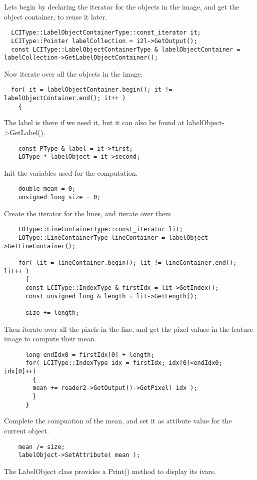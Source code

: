 \documentclass{InsightArticle}
\begin{document}
Lets begin by declaring the iterator for the objects in the image, and get the object container, to reuse it later.
\small \begin{verbatim}
  LCIType::LabelObjectContainerType::const_iterator it;
  LCIType::Pointer labelCollection = i2l->GetOutput();
  const LCIType::LabelObjectContainerType & labelObjectContainer = labelCollection->GetLabelObjectContainer();
\end{verbatim} \normalsize
Now iterate over all the objects in the image.
\small \begin{verbatim}
  for( it = labelObjectContainer.begin(); it != labelObjectContainer.end(); it++ )
    {
\end{verbatim} \normalsize
The label is there if we need it, but it can also be found at labelObject->GetLabel().
\small \begin{verbatim}
    const PType & label = it->first;
    LOType * labelObject = it->second;
\end{verbatim} \normalsize
Init the variables used for the computation.
\small \begin{verbatim}
    double mean = 0;
    unsigned long size = 0;
\end{verbatim} \normalsize
Create the iterator for the lines, and iterate over them
\small \begin{verbatim}
    LOType::LineContainerType::const_iterator lit;
    LOType::LineContainerType lineContainer = labelObject->GetLineContainer();

    for( lit = lineContainer.begin(); lit != lineContainer.end(); lit++ )
      {
      const LCIType::IndexType & firstIdx = lit->GetIndex();
      const unsigned long & length = lit->GetLength();

      size += length;
\end{verbatim} \normalsize
Then iterate over all the pixels in the line, and get the pixel values in the feature image to compute their mean.
\small \begin{verbatim}
      long endIdx0 = firstIdx[0] + length;
      for( LCIType::IndexType idx = firstIdx; idx[0]<endIdx0; idx[0]++)
        {
        mean += reader2->GetOutput()->GetPixel( idx );
        }
      }
\end{verbatim} \normalsize
Complete the compuation of the mean, and set it as attibute value for the current object.
\small \begin{verbatim}
    mean /= size;
    labelObject->SetAttribute( mean );
\end{verbatim} \normalsize
The LabelObject class provides a Print() method to display its ivars.
\end{document}
